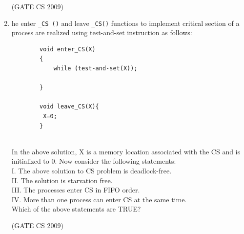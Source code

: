 \documentclass[a4paper, 11pt]{article}
\begin{document}
\begin{enumerate}
    \begin{enumerate}
    \end{enumerate}

    \hfill (GATE CS 2009)

    \item he enter \verb|_CS ()| and leave \verb|_CS()| functions to implement critical section of a process are realized using test-and-set instruction as follows:\\
    \begin{lstlisting}
        void enter_CS(X)
        {
            while (test-and-set(X));
            
        }

        void leave_CS(X){
         X=0;
        }
        
    \end{lstlisting}
    In the above solution, X is a memory location associated with the CS and is initialized to 0. Now consider the following statements:\\
    I. The above solution to CS problem is deadlock-free.\\
    II. The solution is starvation free.\\
    III. The processes enter CS in FIFO order.\\
    IV. More than one process can enter CS at the same time.\\
    Which of the above statements are TRUE?\\
    \begin{enumerate}
    \end{enumerate}

    \hfill (GATE CS 2009)
    

\end{enumerate}
\end{document}
